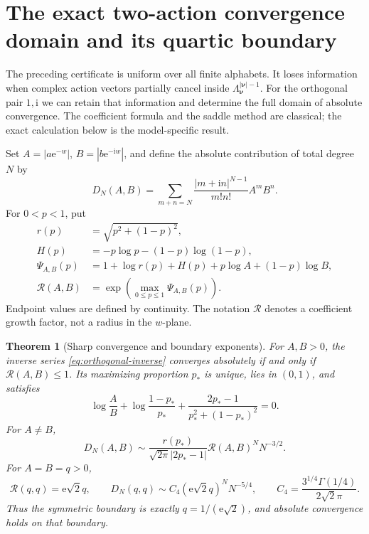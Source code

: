 \documentclass[11pt,a4paper]{article}
\numberwithin{equation}{section}
\newtheorem{theorem}{Theorem}[section]
\theoremstyle{definition}
\theoremstyle{remark}
\newcommand{\ii}{\mathrm i}
\newcommand{\e}{\mathrm e}
\newcommand{\nn}{\boldsymbol\nu}
\begin{document}
\section{The exact two-action convergence domain and its quartic boundary}\label{sec:quartic}

The preceding certificate is uniform over all finite alphabets. It loses
information when complex action vectors partially cancel inside
$\Lambda_{\nn}^{|\nn|-1}$. For the orthogonal pair $1,\ii$ we can retain
that information and determine the full domain of absolute convergence.
The coefficient formula and the saddle method are classical; the exact
calculation below is the model-specific result.

Set $A=|a\e^{-w}|$, $B=|b\e^{-\ii w}|$, and define the absolute
contribution of total degree $N$ by
\begin{equation}\label{eq:DN}
 D_N(A,B)=\sum_{m+n=N}\frac{|m+\ii n|^{N-1}}{m!n!}A^mB^n.
\end{equation}
For $0<p<1$, put
\begin{align}
 r(p)&=\sqrt{p^2+(1-p)^2},\nonumber\\
 H(p)&=-p\log p-(1-p)\log(1-p),\nonumber\\
 \Psi_{A,B}(p)&=1+\log r(p)+H(p)+p\log A+(1-p)\log B,\label{eq:Psi}\\
 \mathcal R(A,B)&=\exp\left(\max_{0\le p\le1}\Psi_{A,B}(p)\right).
 \label{eq:R-variational}
\end{align}
Endpoint values are defined by continuity. The notation $\mathcal R$
denotes a coefficient growth factor, not a radius in the $w$-plane.

\begin{theorem}[Sharp convergence and boundary exponents]\label{thm:exact-domain}
For $A,B>0$, the inverse series \eqref{eq:orthogonal-inverse} converges
absolutely if and only if $\mathcal R(A,B)\le1$. Its maximizing proportion
$p_*$ is unique, lies in $(0,1)$, and satisfies
\begin{equation}\label{eq:pstar}
 \log\frac AB+\log\frac{1-p_*}{p_*}
 +\frac{2p_*-1}{p_*^2+(1-p_*)^2}=0.
\end{equation}
For $A\ne B$,
\begin{equation}\label{eq:gaussian-degree}
 D_N(A,B)\sim\frac{r(p_*)}{\sqrt{2\pi}|2p_*-1|}
 \mathcal R(A,B)^N N^{-3/2}.
\end{equation}
For $A=B=q>0$,
\begin{equation}\label{eq:quartic-degree}
 \mathcal R(q,q)=\e\sqrt2 q,\qquad
 D_N(q,q)\sim C_4(\e\sqrt2 q)^N N^{-5/4},\qquad
 C_4=\frac{3^{1/4}\Gamma(1/4)}{2\sqrt2\pi}.
\end{equation}
Thus the symmetric boundary is exactly $q=1/(\e\sqrt2)$, and absolute
convergence holds on that boundary.
\end{theorem}
\end{document}

